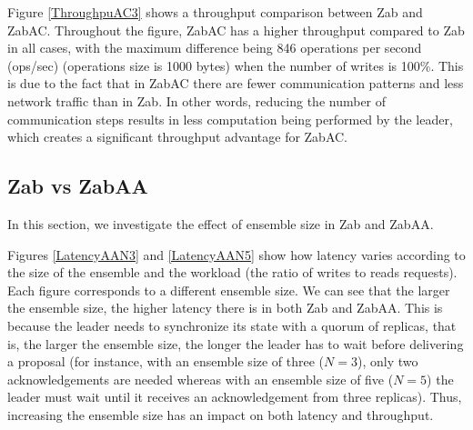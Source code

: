 \documentclass[a4paper,UKenglish]{oasics-v2016}
\begin{document}




Figure \ref{ThroughpuAC3} shows a throughput comparison between Zab and ZabAC. Throughout the figure, ZabAC has a higher throughput compared to Zab in all cases, with the maximum difference being 846 operations per second (ops/sec)  (operations size is 1000 bytes) when the number of writes is 100\%. This is due to the fact that in ZabAC there are fewer communication patterns and less network traffic than in Zab. In other words, reducing the number of communication steps results in less computation being performed by the leader, which creates a significant throughput advantage for ZabAC. 

\subsection{Zab vs ZabAA}

In this section, we investigate the effect of ensemble size in Zab and ZabAA. 


Figures \ref{LatencyAAN3} and \ref{LatencyAAN5} show how latency varies according to the size of the ensemble and the workload (the ratio of writes to reads requests). Each figure corresponds to a different ensemble size. We can see that the larger the ensemble size, the higher latency there is in both Zab and ZabAA. This is because the leader needs to synchronize its state with a quorum of replicas, that is, the larger the ensemble size, the longer the leader has to wait before delivering a proposal (for instance, with an ensemble size of three ($N=3$), only two acknowledgements are needed whereas with an ensemble size of five ($N=5$) the leader must wait until it receives an acknowledgement from three replicas). Thus, increasing the ensemble size has an impact on both latency and throughput.
\end{document}
